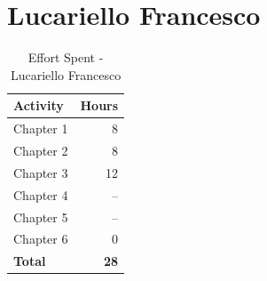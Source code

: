\section{Lucariello Francesco}
\begin{table}[H]
\centering
\begin{tabular}{|l|r|}
\hline
\textbf{Activity} & \textbf{Hours} \\ \hline
Chapter 1 & 8 \\ \hline
Chapter 2 & 8 \\ \hline
Chapter 3 & 12 \\ \hline
Chapter 4 & -- \\ \hline
Chapter 5 & -- \\ \hline
Chapter 6 & 0 \\ \hline
\textbf{Total} & \textbf{28} \\ \hline
\end{tabular}
\caption{Effort Spent - Lucariello Francesco}
\end{table}
